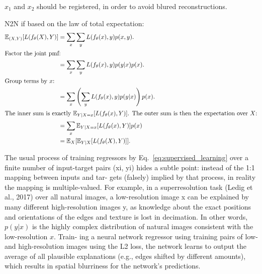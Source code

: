 $x_1$ and $x_2$ should be registered, in order to avoid blured
reconstructions. %

N2N if based on the law of total expectation:
\begin{align*}
\mathbb{E}_{(X,Y)}[L(f_{\theta}(X),Y)] &= \sum_{x}\sum_{y}L(f_{\theta}(x),y) p(x,y). \\
\intertext{Factor the joint pmf:}
&= \sum_{x}\sum_{y}L(f_{\theta}(x),y) p(y|x) p(x). \\
\intertext{Group terms by $x$:}
&= \sum_{x}\left(\sum_{y}L(f_{\theta}(x),y) p(y|x)\right) p(x). \\
\intertext{The inner sum is exactly $\mathbb{E}_{Y|X=x}[L(f_{\theta}(x),Y)]$. The outer sum is then the expectation over $X$:}
&= \sum_{x} \mathbb{E}_{Y|X=x}[L(f_{\theta}(x),Y)] p(x) \\
                                       &= \mathbb{E}_{X}[\mathbb{E}_{Y|X}[L(f_{\theta}(X),Y)]].
                                         \label{eq:5}
\end{align*}

The usual process of training regressors by
Eq.~\ref{eq:supervised_learning} over a finite number of input-target
pairs (xi, yi) hides a subtle point: instead of the 1:1 mapping
between inputs and tar- gets (falsely) implied by that process, in
reality the mapping is multiple-valued. For example, in a superresolution task
(Ledig et al., 2017) over all natural images, a low-resolution
image x can be explained by many different high-resolution
images y, as knowledge about the exact positions and orientations of the edges and texture is lost in decimation. In
other words, $p(y|x)$ is the highly complex distribution of
natural images consistent with the low-resolution $x$. Train-
ing a neural network regressor using training pairs of low-
and high-resolution images using the L2 loss, the network
learns to output the average of all plausible explanations
(e.g., edges shifted by different amounts), which results in
spatial blurriness for the network’s predictions.

